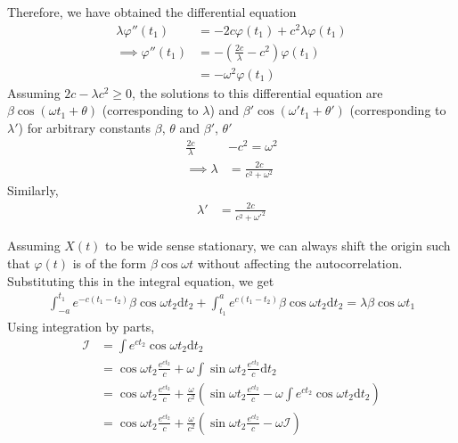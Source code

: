\documentclass{beamer}
\providecommand{\brak}[1]{\ensuremath{\left(#1\right)}}
\begin{document}
	\begin{frame}
	Therefore, we have obtained the differential equation
	\begin{align}
		\lambda\varphi''(t_1) &= -2c\varphi(t_1) + c^2\lambda\varphi(t_1) \\
		\implies \varphi''(t_1) &= -\brak{\frac{2c}{\lambda} - c^2}\varphi(t_1) \\
		&= -\omega^2 \varphi(t_1)
	\end{align}
	Assuming $2c - \lambda c^2 \ge 0$, the solutions to this differential equation are $\beta \cos(\omega t_1 + \theta)$ (corresponding to $\lambda$) and $\beta' \cos(\omega' t_1 + \theta')$ (corresponding to $\lambda'$)
	for arbitrary constants $\beta$, $\theta$ and $\beta'$, $\theta'$
	\begin{align}
		\frac{2c}{\lambda} &- c^2 = \omega^2 \\
		\implies \lambda &= \frac{2c}{c^2+\omega^2} 
	\end{align}
	Similarly,
	\begin{align}
		\lambda' &= \frac{2c}{c^2+\omega'^2} 
	\end{align}
	\end{frame}
	
	\begin{frame}
		Assuming $X(t)$ to be wide sense stationary, we can always shift the origin such that $\varphi(t)$ is of the form $\beta\cos\omega t$ without affecting the autocorrelation.
		Substituting this in the integral equation, we get
		\begin{align}
			\int_{-a}^{t_1} e^{-c(t_1-t_2)}\beta\cos\omega t_2 \mathrm{d}t_2 + \int_{t_1}^{a} e^{c(t_1-t_2)}\beta\cos\omega t_2 \mathrm{d}t_2 = \lambda\beta\cos\omega t_1
		\end{align}
		Using integration by parts,
		\begin{align}
			\mathcal{I} &= \int e^{ct_2} \cos\omega t_2 \mathrm{d}t_2 \\
			&= \cos\omega t_2 \frac{e^{ct_2}}{c} + \omega \int \sin\omega t_2 \frac{e^{ct_2}}{c} \mathrm{d}t_2 \\
			&= \cos\omega t_2 \frac{e^{ct_2}}{c} + \frac{\omega}{c^2} \brak{\sin\omega t_2 \frac{e^{ct_2}}{c} - \omega \int e^{ct_2} \cos\omega t_2 \mathrm{d}t_2}\\
			&= \cos\omega t_2 \frac{e^{ct_2}}{c} + \frac{\omega}{c^2} \brak{\sin\omega t_2 \frac{e^{ct_2}}{c} - \omega \mathcal{I}}
		\end{align}
	\end{frame}
	
\end{document}
